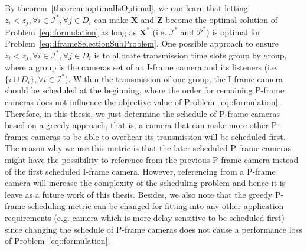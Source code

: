 By theorem~\ref{theorem::optimalIsOptimal}, we can learn that letting ${z_i < z_j}, {\forall i \in \mathcal{I}^*},{\forall j \in D_i}$ can make $\mathbf{X}$ and $\mathbf{Z}$ become the optimal solution of Problem~\eqref{eq::formulation} as long as $\mathbf{X}^*$ (i.e. $\mathcal{I}^*$ and $\mathcal{P}^*$) is optimal for Problem~\eqref{eq::IframeSelectionSubProblem}.
One possible approach to ensure ${z_i < z_j}, {\forall i \in \mathcal{I}^*},{\forall j \in D_i}$ is to allocate transmission time slots group by group, where a group is the cameras set of an I-frame camera and its listeners (i.e. $\{i \cup D_i\},{\forall i \in \mathcal{I}^*}$).
Within the transmission of one group, the I-frame camera should be scheduled at the beginning, where the order for remaining P-frame cameras does not influence the objective value of Problem~\eqref{eq::formulation}.
Therefore, in this thesis, we just determine the schedule of P-frame cameras based on a greedy approach, that is, a camera that can make more other P-frames cameras to be able to overhear its transmission will be scheduled first.
The reason why we use this metric is that the later scheduled P-frame cameras might have the possibility to reference from the previous P-frame camera instead of the first scheduled I-frame camera.
However, referencing from a P-frame camera will increase the complexity of the scheduling problem and hence it is leave as a future work of this thesis.
Besides, we also note that the greedy P-frame scheduling metric can be changed for fitting into any other application requirements (e.g. camera which is more delay sensitive to be scheduled first) since changing the schedule of P-frame cameras does not cause a performance loss of Problem~\eqref{eq::formulation}.

